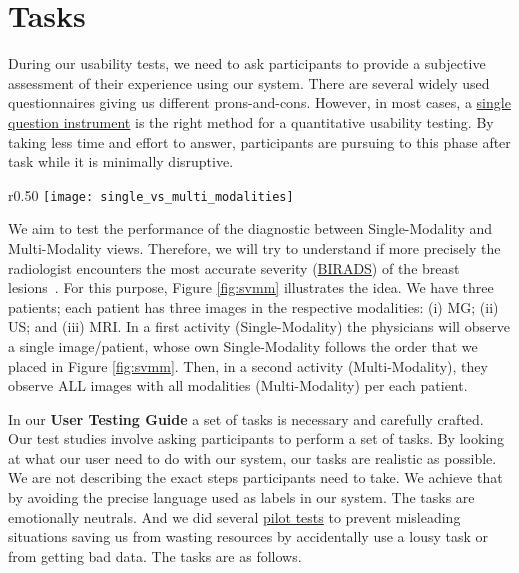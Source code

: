 \section{Tasks}

During our usability tests, we need to ask participants to provide a subjective assessment of their experience using our system. There are several widely used questionnaires giving us different prons-and-cons. However, in most cases, a \hyperlink{https://www.nngroup.com/articles/keep-online-surveys-short/}{single question instrument} \cite{sauro201210} is the right method for a quantitative usability testing. By taking less time and effort to answer, participants are pursuing to this phase after task while it is minimally disruptive.

\clearpage


\hfill

\begin{wrapfigure}{r}{0.50\textwidth}
\centering
\texttt{[image: single\_vs\_multi\_modalities]}
\caption{Single vs Multi}
\label{fig:svmm}
\end{wrapfigure}

\hfill


We aim to test the performance of the diagnostic between Single-Modality and Multi-Modality views. Therefore, we will try to understand if more precisely the radiologist encounters the most accurate severity (\hyperlink{https://en.wikipedia.org/wiki/BI-RADS}{BIRADS}) of the breast lesions~\cite{american1998breast}. For this purpose, Figure \ref{fig:svmm} illustrates the idea. We have three patients; each patient has three images in the respective modalities: (i) MG; (ii) US; and (iii) MRI. In a first activity (Single-Modality) the physicians will observe a single image/patient, whose own Single-Modality follows the order that we placed in Figure \ref{fig:svmm}. Then, in a second activity (Multi-Modality), they observe ALL images with all modalities (Multi-Modality) per each patient.

\hfill

In our \textbf{User Testing Guide} a set of tasks is necessary and carefully crafted. Our test studies involve asking participants to perform a set of tasks. By looking at what our user need to do with our system, our tasks are realistic as possible. We are not describing the exact steps participants need to take. We achieve that by avoiding the precise language used as labels in our system. The tasks are emotionally neutrals. And we did several \hyperlink{https://www.nngroup.com/articles/pilot-testing/}{pilot tests} to prevent misleading situations saving us from wasting resources by accidentally use a lousy task or from getting bad data. The tasks are as follows.

